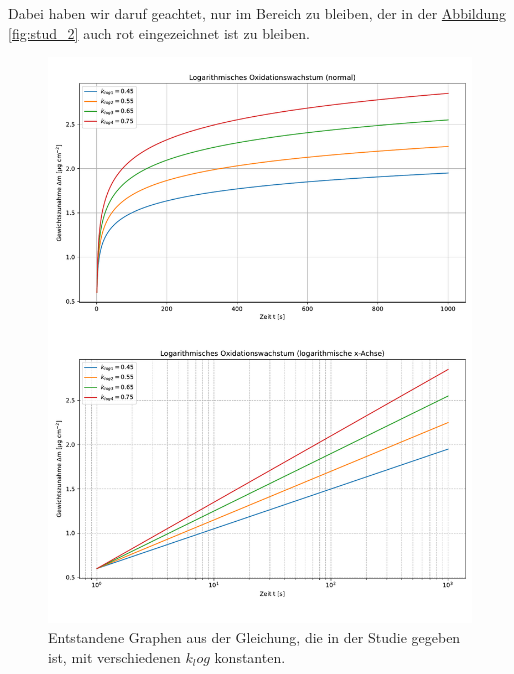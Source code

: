 Dabei haben wir daruf geachtet, nur im Bereich zu bleiben, der in der \hyperref[fig:stud_2]{Abbildung \ref*{fig:stud_2}} auch rot eingezeichnet ist zu bleiben.


\onecolumn
\begin{figure}
    \includegraphics[width=\textwidth, page=1]{img/21/Plots_oxi.pdf}
    \caption{Entstandene Graphen aus der Gleichung, die in der Studie gegeben ist, mit verschiedenen $k_log$ konstanten.}
    \label{fig:log_3}
\end{figure}
\twocolumn